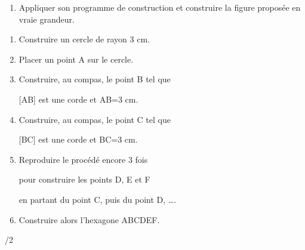 \documentclass[a4paper]{book}
\begin{document}
{\begin{exercice}
\begin{enumerate}
\begin{enumerate}
                \item \points[30]

                \medskip

                \item \points[30]
            \end{enumerate}

            \item Appliquer son programme de construction et construire la figure proposée en vraie grandeur.

            \vspace{9cm}
        \end{enumerate}
    \end{exercice}


    \begin{exercice}
        \begin{enumerate}
            \item Construire un cercle de rayon 3 cm.
            
            \item Placer un point A sur le cercle.
            
            \item Construire, au compas, le point B tel que 
            
            [AB] est une corde et AB=3 cm.
            
            \item Construire, au compas, le point C tel que 
            
            [BC] est une corde et BC=3 cm.
            
            \item Reproduire le procédé encore 3 fois 
            
            pour construire les points D, E et F 
            
            en partant du point C, puis du point D, \ldots.
            
            \item Construire alors l'hexagone ABCDEF.
        \end{enumerate}  
    \end{exercice}


\vfill
\thepage/2 \hfill \text{ }
}
\end{document}
